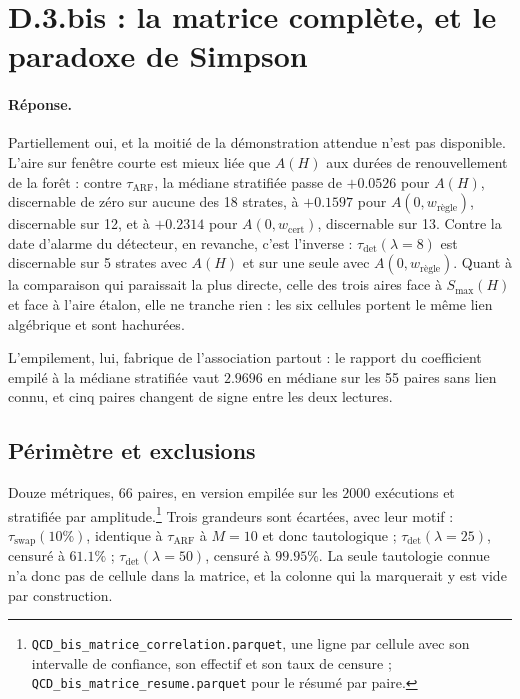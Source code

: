 \documentclass[11pt,a4paper]{article}
\begin{document}
\clearpage

\section{D.3.bis : la matrice complète, et le paradoxe de Simpson}

\paragraph{Réponse.} Partiellement oui, et la moitié de la démonstration attendue n'est pas
disponible. L'aire sur fenêtre courte est mieux liée que $A(H)$ aux durées de renouvellement
de la forêt : contre $\tau_{\mathrm{ARF}}$, la médiane stratifiée passe de $+0.0526$ pour
$A(H)$, discernable de zéro sur aucune des 18 strates, à $+0.1597$ pour
$A(0,w_{\text{règle}})$, discernable sur 12, et à $+0.2314$ pour $A(0,w_{\mathrm{cert}})$,
discernable sur 13. Contre la date d'alarme du détecteur, en revanche, c'est l'inverse :
$\tau_{\mathrm{det}}(\lambda = 8)$ est discernable sur 5 strates avec $A(H)$ et sur une seule
avec $A(0,w_{\text{règle}})$. Quant à la comparaison qui paraissait la plus directe, celle
des trois aires face à $S_{\max}(H)$ et face à l'aire étalon, elle ne tranche rien : les six
cellules portent le même lien algébrique et sont hachurées.

L'empilement, lui, fabrique de l'association partout : le rapport du coefficient empilé à la
médiane stratifiée vaut $2.9696$ en médiane sur les 55 paires sans lien connu, et cinq paires
changent de signe entre les deux lectures.

\subsection{Périmètre et exclusions}

Douze métriques, 66 paires, en version empilée sur les $2000$ exécutions et stratifiée par
amplitude.\footnote{\texttt{QCD\_bis\_matrice\_correlation.parquet}, une ligne par cellule
avec son intervalle de confiance, son effectif et son taux de censure ;
\texttt{QCD\_bis\_matrice\_resume.parquet} pour le résumé par paire.} Trois grandeurs sont
écartées, avec leur motif : $\tau_{\mathrm{swap}}(10\%)$, identique à $\tau_{\mathrm{ARF}}$ à
$M = 10$ et donc tautologique ; $\tau_{\mathrm{det}}(\lambda = 25)$, censuré à $61.1\%$ ;
$\tau_{\mathrm{det}}(\lambda = 50)$, censuré à $99.95\%$. La seule tautologie connue n'a donc
pas de cellule dans la matrice, et la colonne qui la marquerait y est vide par construction.
\end{document}
